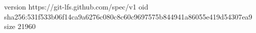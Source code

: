 version https://git-lfs.github.com/spec/v1
oid sha256:531f533b06f14ca9a6276c080c8c60c9697575b844941a86055e419d54307ea9
size 21960
